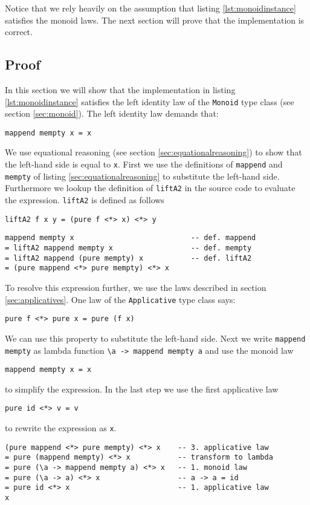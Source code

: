 Notice that we rely heavily on the assumption that listing \ref{lst:monoidinstance} satisfies the monoid laws. The next section will prove that the implementation is correct.

\subsection{Proof}
\label{sec:exampleproof}

In this section we will show that the implementation in listing \ref{lst:monoidinstance} satisfies the left identity law of the \verb|Monoid| type class (see section \ref{sec:monoid}).
The left identity law demands that:
\begin{verbatim}
mappend mempty x = x
\end{verbatim}

We use equational reasoning (see section \ref{sec:equationalreasoning}) to show that the left-hand side is equal to \verb|x|. First we use the definitions of \verb|mappend| and \verb|mempty| of listing \ref{sec:equationalreasoning} to substitute the left-hand side. Furthermore we lookup the definition of \verb|liftA2| in the source code \cite{control.applicative} to evaluate the expression. 
\verb|liftA2| is defined as follows
\begin{verbatim}
liftA2 f x y = (pure f <*> x) <*> y
\end{verbatim}

\begin{verbatim}
mappend mempty x                           -- def. mappend
= liftA2 mappend mempty x                  -- def. mempty
= liftA2 mappend (pure mempty) x           -- def. liftA2
= (pure mappend <*> pure mempty) <*> x
\end{verbatim}

To resolve this expression further, we use the laws described in section \ref{sec:applicatives}.
One law of the \verb|Applicative| type class says:
\begin{verbatim}
pure f <*> pure x = pure (f x)
\end{verbatim}
We can use this property to substitute the left-hand side. Next we write \verb|mappend mempty| as lambda function \verb|\a -> mappend mempty a| and use the monoid law
\begin{verbatim}
mappend mempty x = x
\end{verbatim}
to simplify the expression. In the last step we use the first applicative law
\begin{verbatim}
pure id <*> v = v
\end{verbatim}
 to rewrite the expression as \verb|x|.
\begin{verbatim}
(pure mappend <*> pure mempty) <*> x    -- 3. applicative law
= pure (mappend mempty) <*> x           -- transform to lambda
= pure (\a -> mappend mempty a) <*> x   -- 1. monoid law 
= pure (\a -> a) <*> x                  -- a -> a = id
= pure id <*> x                         -- 1. applicative law
x
\end{verbatim}

